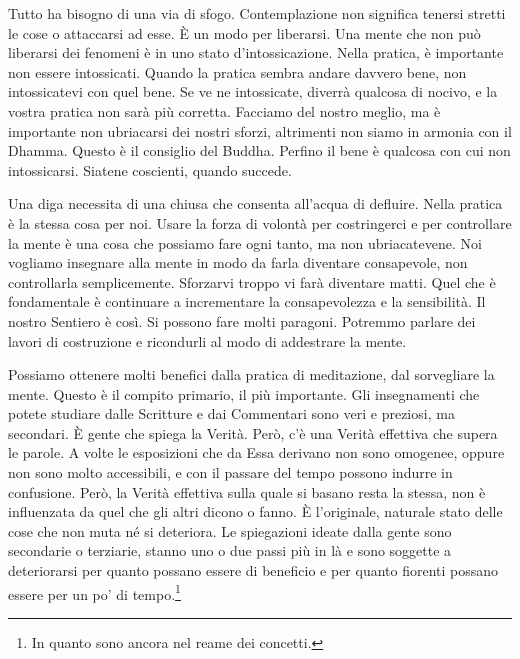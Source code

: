 Tutto ha bisogno di una via di sfogo. Contemplazione non significa
tenersi stretti le cose o attaccarsi ad esse. È un modo per liberarsi.
Una mente che non può liberarsi dei fenomeni è in uno stato
d'intossicazione. Nella pratica, è importante non essere intossicati.
Quando la pratica sembra andare davvero bene, non intossicatevi con quel
bene. Se ve ne intossicate, diverrà qualcosa di nocivo, e la vostra
pratica non sarà più corretta. Facciamo del nostro meglio, ma è
importante non ubriacarsi dei nostri sforzi, altrimenti non siamo in
armonia con il Dhamma. Questo è il consiglio del Buddha. Perfino il bene
è qualcosa con cui non intossicarsi. Siatene coscienti, quando succede.

Una diga necessita di una chiusa che consenta all'acqua di defluire.
Nella pratica è la stessa cosa per noi. Usare la forza di volontà per
costringerci e per controllare la mente è una cosa che possiamo fare
ogni tanto, ma non ubriacatevene. Noi vogliamo insegnare alla mente in
modo da farla diventare consapevole, non controllarla semplicemente.
Sforzarvi troppo vi farà diventare matti. Quel che è fondamentale è
continuare a incrementare la consapevolezza e la sensibilità. Il nostro
Sentiero è così. Si possono fare molti paragoni. Potremmo parlare dei
lavori di costruzione e ricondurli al modo di addestrare la mente.

Possiamo ottenere molti benefici dalla pratica di meditazione, dal
sorvegliare la mente. Questo è il compito primario, il più importante.
Gli insegnamenti che potete studiare dalle Scritture e dai Commentari
sono veri e preziosi, ma secondari. È gente che spiega la Verità. Però,
c'è una Verità effettiva che supera le parole. A volte le esposizioni
che da Essa derivano non sono omogenee, oppure non sono molto
accessibili, e con il passare del tempo possono indurre in confusione.
Però, la Verità effettiva sulla quale si basano resta la stessa, non è
influenzata da quel che gli altri dicono o fanno. È l'originale,
naturale stato delle cose che non muta né si deteriora. Le spiegazioni
ideate dalla gente sono secondarie o terziarie, stanno uno o due passi
più in là e sono soggette a deteriorarsi per quanto possano essere di
beneficio e per quanto fiorenti possano essere per un po' di
tempo.\footnote{In quanto sono ancora nel reame dei concetti.}

